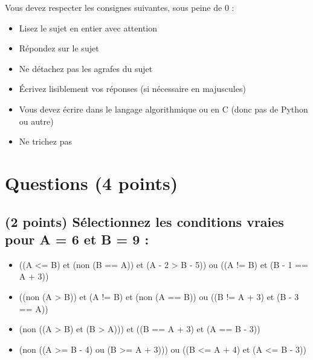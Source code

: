 \documentclass[11pt,a4paper]{article}
\begin{document}
\MakeExamTitle                   %


\bigskip

Vous devez respecter les consignes suivantes, sous peine de 0 :

\begin{itemize}
\item Lisez le sujet en entier avec attention
\item Répondez sur le sujet
\item Ne détachez pas les agrafes du sujet
\item \'Ecrivez lisiblement vos réponses (si nécessaire en majuscules)
\item Vous devez écrire dans le langage algorithmique ou en C (donc pas de Python ou autre)
\item Ne trichez pas
\end{itemize}


\vfillFirst


\section{Questions (4 points)}

\subsection{(2 points) Sélectionnez les conditions vraies pour A = 6 et B = 9 : }

\bigskip

\begin{itemize}
  \item[\CaseCoche] ((A <= B) et (non (B == A)) et (A - 2 > B - 5)) ou ((A != B) et (B - 1 == A + 3)) \\ %
  \item[\CaseCoche] ((non (A > B)) et (A != B) et (non (A == B)) ou ((B != A + 3) et (B - 3 == A)) \\ %
  \item[\CaseCoche] (non ((A > B) et (B > A))) et ((B == A + 3) et (A == B - 3)) \\ %
  \item[\CaseCoche] (non ((A >= B - 4) ou (B >= A + 3))) ou ((B <= A + 4) et (A <= B - 3)) \\ %
\end{itemize}
\end{document}
